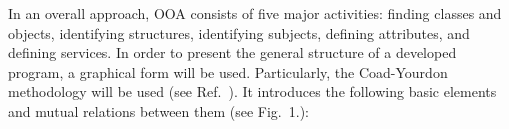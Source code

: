 \begin{htmlonly}
\begin{center}
In an overall approach, OOA consists of five major activities: finding classes and objects, identifying structures, identifying subjects, defining attributes, and defining services.
In order to present the general structure of a developed program, 
a graphical form will be used. Particularly, the Coad-Yourdon methodology
will be used (see Ref.~\cite{CoadYourdon}). It introduces the following basic elements and mutual
relations between them (see Fig.~1.):



\end{center}
\end{htmlonly}
